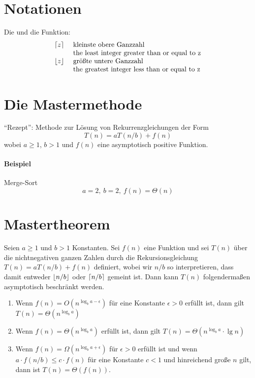 \documentclass[a4paper,twoside,DIV15,BCOR12mm]{scrbook}
\begin{document}
\section{Notationen}
  Die  und die  Funktion:
  $$\begin{array}{cl}
  	\left\lceil z \right\rceil &\text{ kleinste obere Ganzzahl}\\
  	            &\text{ the least integer greater than or equal to z}\\
  	\left\lfloor z \right\rfloor &\text{ größte untere Ganzzahl}\\
  	            &\text{ the greatest integer less than or equal to z}
  \end{array}$$
  
\section{Die Mastermethode}
  "`Rezept"': Methode zur Lösung von Rekurrenzgleichungen der Form
  $$T(n)= aT(n/b)+f(n)$$
  wobei $a \geq 1$, $b>1$ und $f(n)$ eine asymptotisch positive Funktion.
  
\paragraph{Beispiel} Merge-Sort
	$$a=2,\ b=2,\ f(n)=\Theta(n)$$

\section{Mastertheorem}
	Seien $a \geq 1$ und $b>1$ Konstanten. Sei $f(n)$ eine Funktion und sei $T(n)$ über die nichtnegativen
	ganzen Zahlen durch die Rekursionsgleichung $T(n)= aT(n/b)+f(n)$ definiert, wobei wir $n/b$ so interpretieren,
	dass damit entweder $\left\lfloor n/b \right\rfloor$ oder $\left\lceil n/b \right\rceil$ gemeint ist. Dann kann $T(n)$ folgendermaßen asymptotisch
	beschränkt werden.
\begin{enumerate}
\item Wenn $f(n)=O(n^{\log_ba-\epsilon})$ für eine Konstante $\epsilon > 0$ erfüllt ist, dann gilt $T(n)=\Theta(n^{\log_ba})$
\item Wenn $f(n)=\Theta(n^{\log_ba})$ erfüllt ist, dann gilt $T(n) = \Theta(n^{\log_ba}\cdot \lg n)$
\item Wenn $f(n)=\Omega(n^{\log_ba+\epsilon})$ für $\epsilon > 0$ erfüllt ist und wenn $a\cdot f(n/b) \leq c \cdot f(n)$ für eine Konstante
			$c < 1$ und hinreichend große $n$ gilt, dann ist $T(n)=\Theta(f(n))$.
\end{enumerate}
\end{document}
